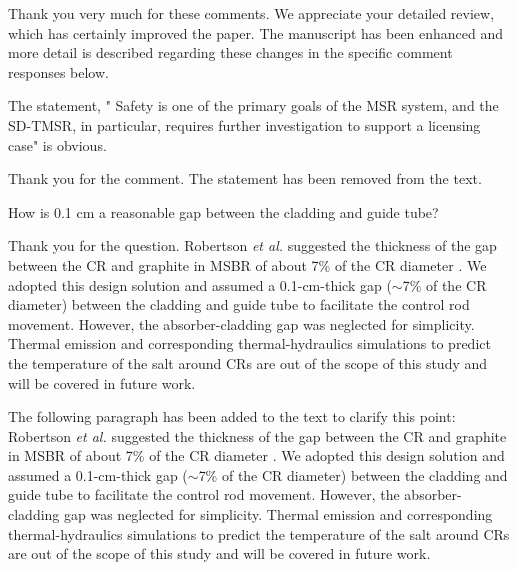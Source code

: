 \documentclass[answers,11pt]{exam}
\begin{document}
\begin{questions}
        \begin{solution}
        	 Thank you very much for these comments. We appreciate your detailed review, which has certainly improved the paper. The manuscript has been enhanced and more detail is described regarding these changes in the specific comment responses below.
        	

        \end{solution}

        \question  The statement, " Safety is one of the primary goals of the MSR system, and the SD-TMSR, in particular, requires further investigation to support a licensing case" is obvious.
        
        \begin{solution}
             
              Thank you for the comment. The statement has been removed from the text.
              
        \end{solution}

        \question How is 0.1 cm a reasonable gap between the cladding and guide tube?
        \begin{solution}
        	
Thank you for the question. Robertson \emph{et al.} suggested the thickness of the gap between the CR and graphite in MSBR of about 7\% of the CR diameter \cite{robertson_conceptual_1971}. We adopted this design solution and assumed a 0.1-cm-thick gap ($\sim$7\% of the CR diameter) between the cladding and guide tube to facilitate the control rod movement. However, the absorber-cladding gap was neglected for simplicity. Thermal emission and corresponding thermal-hydraulics simulations to predict the temperature of the salt around CRs are out of the scope of this study and will be covered in future work.

The following paragraph has been added to the text to clarify this point:\\

Robertson \emph{et al.} suggested the thickness of the gap between the CR and graphite in MSBR of about 7\% of the CR diameter \cite{robertson_conceptual_1971}. We adopted this design solution and assumed a 0.1-cm-thick gap ($\sim$7\% of the CR diameter) between the cladding and guide tube to facilitate the control rod movement. However, the absorber-cladding gap was neglected for simplicity. Thermal emission and corresponding thermal-hydraulics simulations to predict the temperature of the salt around CRs are out of the scope of this study and will be covered in future work.




\end{solution}
\end{questions}
\end{document}
